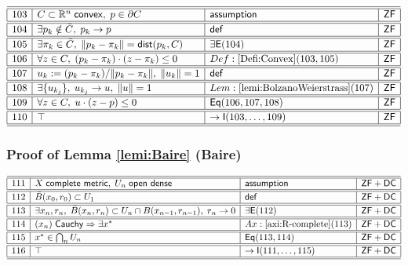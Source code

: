 \documentclass[11pt,reqno]{amsart}
\begin{document}
\noindent$%
\begin{array}{|r|l|l|l|}
\hline\hline
103 & C\subset\mathbb{R}^{n}\;\mathsf{convex},\;p\in\partial C & \mathsf{assumption} & \mathsf{ZF} \\ \hline\hline
104 & \exists p_{k}\notin\bar{C},\;p_{k}\to p & \mathsf{def} & \mathsf{ZF} \\ \hline\hline
105 & \exists\pi_{k}\in\bar{C},\;\|p_{k}-\pi_{k}\|=\mathsf{dist}(p_{k},C) & \exists\mathsf{E}(104) & \mathsf{ZF} \\ \hline\hline
106 & \forall z\in C,\;(p_{k}-\pi_{k})\cdot(z-\pi_{k})\le0 & Def:\ref{Defi:Convex}(103,105) & \mathsf{ZF} \\ \hline\hline
107 & u_{k}:=(p_{k}-\pi_{k})/\|p_{k}-\pi_{k}\|,\;\|u_{k}\|=1 & \mathsf{def} & \mathsf{ZF} \\ \hline\hline
108 & \exists\{u_{k_{j}}\},\;u_{k_{j}}\to u,\;\|u\|=1 & Lem:\ref{lemi:BolzanoWeierstrass}(107) & \mathsf{ZF} \\ \hline\hline
109 & \forall z\in C,\;u\cdot(z-p)\le0 & \mathsf{Eq}(106,107,108) & \mathsf{ZF} \\ \hline\hline
110 & \top & \to\mathsf{I}(103,\dots,109) & \mathsf{ZF} \\ \hline\hline
\end{array}%
$

\medskip

\subsubsection*{Proof of Lemma \ref{lemi:Baire} (\textsf{Baire})}

\noindent$%
\begin{array}{|r|l|l|l|}
\hline\hline
111 & X\;\mathsf{complete\ metric},\;U_{n}\;\mathsf{open\ dense} & \mathsf{assumption} & \mathsf{ZF+DC} \\ \hline\hline
112 & \bar{B}(x_{0},r_{0})\subset U_{1} & \mathsf{def} & \mathsf{ZF+DC} \\ \hline\hline
113 & \exists x_{n},r_{n},\;\bar{B}(x_{n},r_{n})\subset U_{n}\cap B(x_{n-1},r_{n-1}),\;r_{n}\to0 & \exists\mathsf{E}(112) & \mathsf{ZF+DC} \\ \hline\hline
114 & (x_{n})\;\mathsf{Cauchy}\Rightarrow\exists x^{*} & Ax:\ref{axi:R-complete}(113) & \mathsf{ZF+DC} \\ \hline\hline
115 & x^{*}\in\bigcap_{n}U_{n} & \mathsf{Eq}(113,114) & \mathsf{ZF+DC} \\ \hline\hline
116 & \top & \to\mathsf{I}(111,\dots,115) & \mathsf{ZF+DC} \\ \hline\hline
\end{array}%
$
\end{document}
